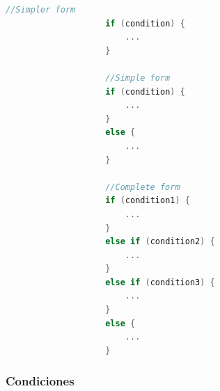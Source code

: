 \documentclass[12pt, fleqn]{report}                             %
\theoremstyle{break}                                            %
\begin{document}
                \begin{lstlisting}[language=C++, gobble=20]
                    //Simpler form
                    if (condition) {
                        ...
                    }

                    //Simple form
                    if (condition) {
                        ...
                    }
                    else {
                        ...
                    }
                    
                    //Complete form
                    if (condition1) {
                        ...
                    }
                    else if (condition2) {
                        ...
                    }
                    else if (condition3) {
                        ...
                    }
                    else {
                        ...
                    }
                \end{lstlisting}


                \clearpage
                \subsubsection{Condiciones}
\end{document}
